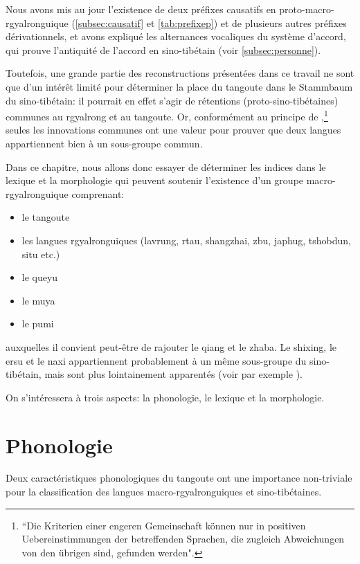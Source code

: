 \documentclass[oldfontcommands,twoside,a4paper,11pt,draft]{memoir}
\begin{document}
Nous avons mis au jour l'existence de deux préfixes causatifs en proto-macro-rgyalronguique (\ref{subsec:causatif} et \ref{tab:prefixep}) et de plusieurs autres préfixes dérivationnels, et avons expliqué les alternances vocaliques du système d'accord, qui prouve l'antiquité de l'accord en sino-tibétain (voir \ref{subsec:personne}).

Toutefois, une grande partie des reconstructions présentées dans ce travail ne sont que d'un intérêt limité pour déterminer la place du tangoute dans le Stammbaum du sino-tibétain: il pourrait en effet s'agir de rétentions (proto-sino-tibétaines) communes au rgyalrong et au tangoute. Or, conformément au principe de \citet[VII]{leskien1876},\footnote{``Die Kriterien einer engeren Gemeinschaft können nur in positiven Uebereinstimmungen der betreffenden Sprachen, die zugleich Abweichungen von den übrigen sind, gefunden werden".} seules les innovations communes ont une valeur pour prouver que deux langues appartiennent bien à un sous-groupe commun.

Dans ce chapitre, nous allons donc essayer de déterminer les indices dans le lexique et la morphologie qui peuvent soutenir l'existence d'un groupe macro-rgyalronguique comprenant:

\begin{itemize}
\item le tangoute
\item les langues rgyalronguiques (lavrung, rtau, shangzhai, zbu, japhug, tshobdun, situ etc.)
\item le queyu
\item le muya
\item le pumi 
\end{itemize}
auxquelles il convient peut-être de rajouter  le qiang et le zhaba. Le shixing, le ersu et le naxi appartiennent probablement à un même sous-groupe du sino-tibétain, mais sont plus lointainement apparentés (voir par exemple \citealt{chirkova12qiangic}).

On s'intéressera à trois aspects: la phonologie, le lexique et la morphologie.

\section{Phonologie}

Deux caractéristiques phonologiques du tangoute ont une importance non-triviale pour la classification des langues macro-rgyalronguiques et sino-tibétaines.
\end{document}
